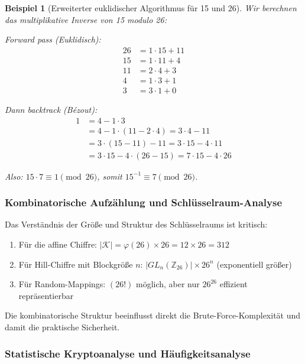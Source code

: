 ﻿\documentclass[12pt,a4paper]{article}
\newtheorem{example}{Beispiel}
\begin{document}
	\begin{example}[Erweiterter euklidischer Algorithmus für 15 und 26]
		Wir berechnen das multiplikative Inverse von 15 modulo 26:
		
		Forward pass (Euklidisch):
		\begin{align}
			26 &= 1 \cdot 15 + 11 \\
			15 &= 1 \cdot 11 + 4 \\
			11 &= 2 \cdot 4 + 3 \\
			4 &= 1 \cdot 3 + 1 \\
			3 &= 3 \cdot 1 + 0
		\end{align}
		
		Dann backtrack (Bézout):
		\begin{align}
			1 &= 4 - 1 \cdot 3 \\
			&= 4 - 1 \cdot (11 - 2 \cdot 4) = 3 \cdot 4 - 11 \\
			&= 3 \cdot (15 - 11) - 11 = 3 \cdot 15 - 4 \cdot 11 \\
			&= 3 \cdot 15 - 4 \cdot (26 - 15) = 7 \cdot 15 - 4 \cdot 26
		\end{align}
		
		Also: $15 \cdot 7 \equiv 1 \pmod{26}$, somit $15^{-1} \equiv 7 \pmod{26}$.
	\end{example}
	
	\subsubsection{Kombinatorische Aufzählung und Schlüsselraum-Analyse}
	
	Das Verständnis der Größe und Struktur des Schlüsselraums ist kritisch:
	\begin{enumerate}
		\item Für die affine Chiffre: $|\mathcal{K}| = \varphi(26) \times 26 = 12 \times 26 = 312$
		\item Für Hill-Chiffre mit Blockgröße $n$: $|GL_n(\mathbb{Z}_{26})| \times 26^n$ (exponentiell größer)
		\item Für Random-Mappings: $(26!)$ möglich, aber nur $26^{26}$ effizient repräsentierbar
	\end{enumerate}
	
	Die kombinatorische Struktur beeinflusst direkt die Brute-Force-Komplexität und damit die praktische Sicherheit.
	
	\subsubsection{Statistische Kryptoanalyse und Häufigkeitsanalyse}
	
\end{document}
